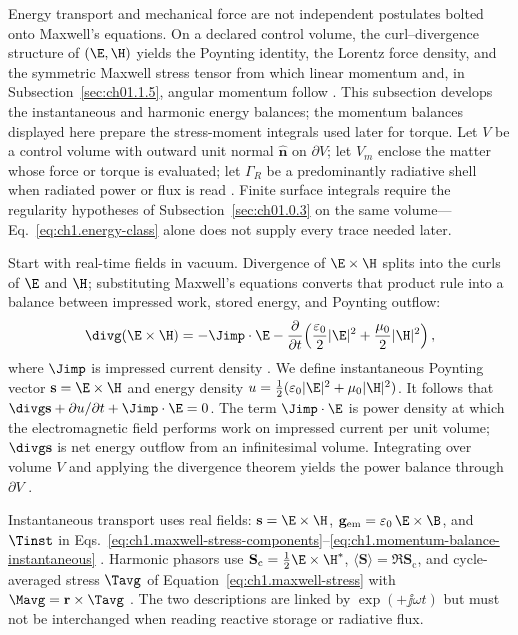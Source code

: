 Energy transport and mechanical force are not independent postulates bolted onto Maxwell's equations. On a declared control volume, the curl--divergence structure of $(\E,\H)$ yields the Poynting identity, the Lorentz force density, and the symmetric Maxwell stress tensor from which linear momentum and, in Subsection~\ref{sec:ch01.1.5}, angular momentum follow \cite{poynting1884,maxwell1873}. This subsection develops the instantaneous and harmonic energy balances; the momentum balances displayed here prepare the stress-moment integrals used later for torque. Let $V$ be a control volume with outward unit normal $\hat{\mathbf{n}}$ on $\partial V$; let $V_m$ enclose the matter whose force or torque is evaluated; let $\Gamma_R$ be a predominantly radiative shell when radiated power or flux is read \cite{stratton1941}. Finite surface integrals require the regularity hypotheses of Subsection~\ref{sec:ch01.0.3} on the same volume---Eq.~\eqref{eq:ch1.energy-class} alone does not supply every trace needed later.

Start with real-time fields in vacuum. Divergence of $\E\times\H$ splits into the curls of $\E$ and $\H$; substituting Maxwell's equations converts that product rule into a balance between impressed work, stored energy, and Poynting outflow:
\begin{equation}
\label{eq:ch1.poynting-instantaneous}
\divg(\E\times\H)
=-\Jimp\cdot\E
-\frac{\partial}{\partial t}\!\left(\frac{\varepsilon_0}{2}|\E|^2+\frac{\mu_0}{2}|\H|^2\right),
\end{equation}
where $\Jimp$ is impressed current density \cite{stratton1941}. We define instantaneous
Poynting vector $\mathbf{s}=\E\times\H$ and energy density
$u=\tfrac12(\varepsilon_0|\E|^2+\mu_0|\H|^2)$. It follows that
$\divg\mathbf{s}+\partial u/\partial t+\Jimp\cdot\E=0$. The term $\Jimp\cdot\E$ is
power density at which the electromagnetic field performs work on impressed current per unit volume; $\divg\mathbf{s}$ is net energy
outflow from an infinitesimal volume. Integrating over volume $V$ and applying the
divergence theorem yields the power balance through $\partial V$ \cite{poynting1884}.

Instantaneous transport uses real fields: $\mathbf{s}=\E\times\H$, $\mathbf{g}_{\mathrm{em}}=\varepsilon_0\,\E\times\B$, and $\Tinst$ in Eqs.~\eqref{eq:ch1.maxwell-stress-components}--\eqref{eq:ch1.momentum-balance-instantaneous} \cite{maxwell1873,poynting1884}. Harmonic phasors use $\mathbf{S}_\mathrm{c}=\tfrac12\E\times\H^*$, $\langle\mathbf{S}\rangle=\Re\mathbf{S}_\mathrm{c}$, and cycle-averaged stress $\Tavg$ of Equation~\eqref{eq:ch1.maxwell-stress} with $\Mavg=\mathbf{r}\times\Tavg$ \cite{stratton1941}. The two descriptions are linked by $\exp(+\jj\omega t)$ but must not be interchanged when reading reactive storage or radiative flux.

